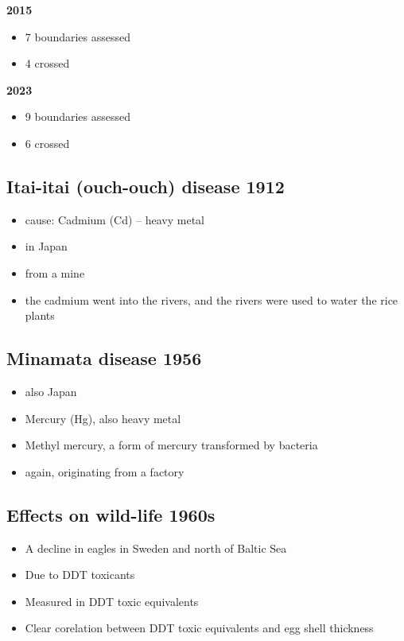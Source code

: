 \textbf{2015}
\begin{itemize}
	\item 7 boundaries assessed
	\item 4 crossed
\end{itemize}

\textbf{2023}
\begin{itemize}
	\item 9 boundaries assessed
	\item 6 crossed
\end{itemize}

\subsection{Itai-itai (ouch-ouch) disease 1912}
\begin{itemize}
	\item cause: Cadmium (Cd) -- heavy metal
	\item in Japan
	\item from a mine
	\item the cadmium went into the rivers, and the rivers were used to
		water the rice plants
\end{itemize}

\subsection{Minamata disease 1956}
\begin{itemize}
	\item also Japan
	\item Mercury (Hg), also heavy metal
	\item Methyl mercury, a form of mercury transformed by bacteria
	\item again, originating from a factory
\end{itemize}

\subsection{Effects on wild-life 1960s}
\begin{itemize}
	\item A decline in eagles in Sweden and north of Baltic Sea
	\item Due to DDT toxicants
	\item Measured in DDT toxic equivalents
	\item Clear corelation between DDT toxic equivalents and egg shell
		thickness
\end{itemize}


